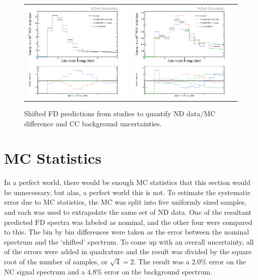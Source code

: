 \begin{figure}[htb]
  \centering
  \begin{tabular}{c c}
    \includegraphics[width=.47\textwidth]{figures/Systs/cNCEXDecompSysts.png} &
    \includegraphics[width=.47\textwidth]{figures/Systs/cBGEXDecompSysts.png} \\
  \end{tabular}
  \caption[Systematic Error Due to ND Data/MC Discrepancy and CC Background Uncertainty]{Shifted FD predictions from studies to quantify ND data/MC difference and CC background uncertainties.}
  \label{fig:SystNDDataMC}
\end{figure}

\section{MC Statistics}

In a perfect world, there would be enough MC statistics that this section would be unnecessary, but alas, a perfect world this is not. To estimate the systematic error due to MC statistics, the MC was split into five uniformly sized samples, and each was used to extrapolate the same set of ND data. One of the resultant predicted FD spectra was labeled as nominal, and the other four were compared to this. The bin by bin differences were taken as the error between the nominal spectrum and the `shifted' spectrum. To come up with an overall uncertainty, all of the errors were added in quadrature and the result was divided by the square root of the number of samples, or $\sqrt{4} = 2$. The result was a $2.0\%$ error on the NC signal spectrum and a $4.8\%$ error on the background spectrum.

